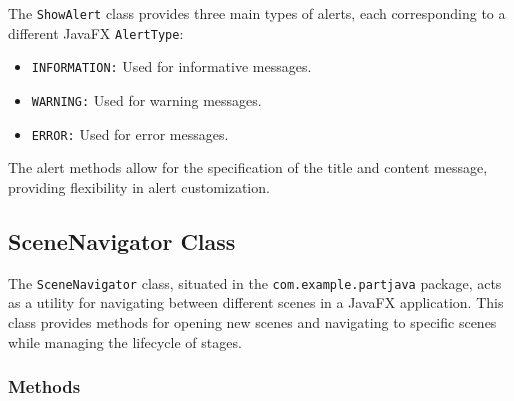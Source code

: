 \documentclass{article}
\begin{document}
The \texttt{ShowAlert} class provides three main types of alerts, each corresponding to a different JavaFX \texttt{AlertType}:
\begin{itemize}
    \item \texttt{INFORMATION:} Used for informative messages.
    \item \texttt{WARNING:} Used for warning messages.
    \item \texttt{ERROR:} Used for error messages.
\end{itemize}

The alert methods allow for the specification of the title and content message, providing flexibility in alert customization.

\subsection{SceneNavigator Class}\label{scene-navigator}

The \texttt{SceneNavigator} class, situated in the \texttt{com.example.partjava} package, acts as a utility for navigating between different scenes in a JavaFX application. This class provides methods for opening new scenes and navigating to specific scenes while managing the lifecycle of stages.

\subsubsection{Methods}
\end{document}
